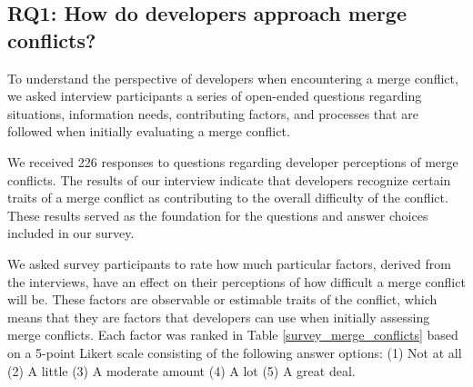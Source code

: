 \subsection{\textbf{RQ1:} How do developers approach merge conflicts?}\label{RQ1}
To understand the perspective of developers when encountering a merge conflict, we asked interview participants a series of open-ended questions regarding situations, information needs, contributing factors, and processes that are followed when initially evaluating a merge conflict.

We received 226 responses to questions regarding developer perceptions of merge conflicts.
The results of our interview indicate that developers recognize certain traits of a merge conflict as contributing to the overall difficulty of the conflict.
These results served as the foundation for the questions and answer choices included in our survey.

We asked survey participants to rate how much particular factors, derived from the interviews, have an effect on their perceptions of how difficult a merge conflict will be. These factors are observable or estimable traits of the conflict, which means that they are factors that developers can use when initially assessing merge conflicts.
Each factor was ranked in Table \ref{survey_merge_conflicts} based on a 5-point Likert scale consisting of the following answer options:
(1) Not at all (2) A little (3) A moderate amount (4) A lot (5) A great deal.




